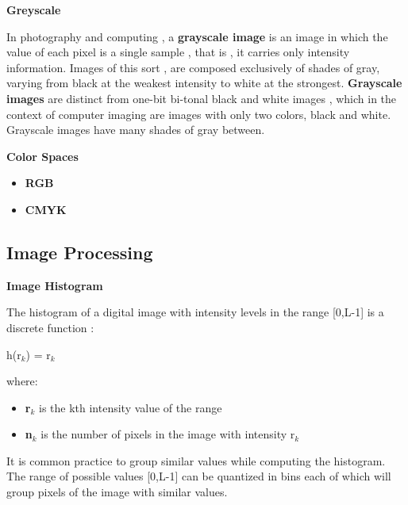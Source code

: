 \documentclass{article}
\begin{document}
 \textbf{Greyscale}
 \vspace{2mm}
 
 In photography and computing , a \textbf{grayscale image} is an image in which the value of each pixel is a single sample , that is , it carries only intensity information. Images of this sort , are composed exclusively of shades of gray, varying from black at the weakest intensity to white at the strongest.
 \textbf{Grayscale images} are distinct from one-bit bi-tonal black and white images , which in the context of computer imaging are images with only two colors, black and white. Grayscale images have many shades of gray between.
 \vspace{2mm}
 
 \textbf{Color Spaces} 
 \vspace{2mm}
 \begin{itemize}
     \item \textbf{RGB} 
     \item \textbf{CMYK} 
 \end{itemize}

     

\subsection{Image Processing}
 \vspace{2mm}
 
 \textbf{Image Histogram}
 \vspace{2mm}

The histogram of a digital image with intensity levels in the range [0,L-1] is a discrete function :

\begin{center}
    h(r$_k$) = r$_k$
\end{center}

where: \begin{itemize}
    \item \textbf{r$_k$} is the kth intensity value of the range
    \item \textbf{n$_k$} is the number of pixels in the image with intensity r$_k$
\end{itemize}
It is common practice to group similar values while computing the histogram. The range of possible values [0,L-1] can be quantized in bins each of which will group pixels of the image with similar values.
\end{document}
